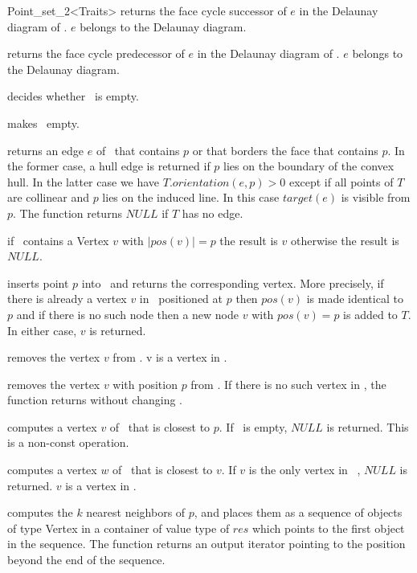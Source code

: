 \begin{ccRefClass}{Point_set_2<Traits>}
{ returns the face cycle successor of $e$ in the Delaunay diagram 
of \ccVar . \ccPrecond  $e$ belongs to the Delaunay diagram.}

{ returns the face cycle predecessor of $e$ in the Delaunay diagram 
of \ccVar. \ccPrecond  $e$ belongs to the Delaunay diagram.}

{ decides whether \ccVar\ is empty. }

{ makes \ccVar\ empty. }

{ returns an edge $e$ of \ccVar\ that contains $p$ or that 
borders the face that contains $p$. In the former case, 
a hull edge is returned if $p$ lies on the boundary of the convex hull.
In the latter case we have $T.orientation(e,p) > 0$ except if all points of
$T$ are collinear and 
$p$ lies on the induced line. In this case $target(e)$ is visible from 
$p$. The function returns $NULL$ if $T$ has no edge.}


\ccHtmlLinksOff

{ if \ccVar\ contains a Vertex $v$ with $|pos(v)| = p$ 
the result is $v$ otherwise the result is $NULL$. }

{ inserts point $p$ into \ccVar\ and returns the corresponding vertex. 
More precisely, if there is already a vertex $v$ in \ccVar\ positioned 
at $p$ then $pos(v)$ is made identical to $p$ and if there is no 
such node then a new node $v$ with $pos(v) = p$ is added to $T$. 
In either case, $v$ is returned.}

{ removes the vertex $v$ from \ccVar. \ccPrecond v is a vertex in \ccVar.}

{ removes the vertex $v$ with position $p$ from \ccVar. If there is
no such vertex in \ccVar, the function returns without changing \ccVar. }

{ computes a vertex $v$ of \ccVar\ that is closest to $p$.
If \ccVar\ is empty, $NULL$ is returned.
This is a non-const operation.}

{ computes a vertex $w$ of \ccVar\ that is closest to $v$.
If $v$ is the only vertex in \ccVar\ , $NULL$ is returned.
\ccPrecond $v$ is a vertex in \ccVar.}

{ computes the $k$ nearest neighbors of $p$, and places them as a sequence of objects of type
Vertex in a container of value type of $res$
which points to the first object in the sequence. The function
returns an output iterator pointing to the position beyond the end
of the sequence. }


\end{ccRefClass}
